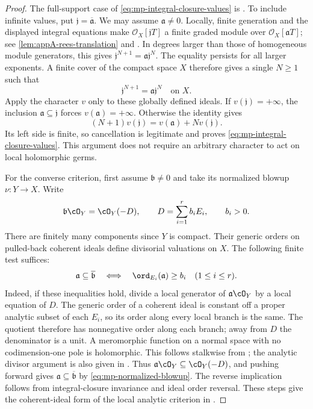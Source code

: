 \begin{proof}
The full-support case of \eqref{eq:mp-integral-closure-values} is
\cite[Lemma~2.2.4]{MPTropicalV2}. To include infinite values, put
$\mathfrak j=\overline{\mathfrak a}$. We may assume
$\mathfrak a\ne0$. Locally, finite generation and the displayed
integral equations make $\mathcal O_X[\mathfrak jT]$ a finite
graded module over $\mathcal O_X[\mathfrak aT]$; see
\cref{lem:appA-rees-translation} and \cite[Tag~00H3]{stacks-project}.
In degrees larger than those of homogeneous module generators,
this gives $\mathfrak j^{N+1}=\mathfrak a\mathfrak j^N$.
The equality persists for all larger exponents. A finite cover of
the compact space $X$ therefore gives a single $N\geq1$ such that
\[
           \mathfrak j^{N+1}=\mathfrak a\mathfrak j^N
           \quad\text{on }X.
\]
Apply the character $v$ only to these globally defined ideals.
If $v(\mathfrak j)=+\infty$, the inclusion
$\mathfrak a\subseteq\mathfrak j$ forces
$v(\mathfrak a)=+\infty$. Otherwise the identity gives
\[
 (N+1)v(\mathfrak j)=v(\mathfrak a)+Nv(\mathfrak j).
\]
Its left side is finite, so cancellation is legitimate and proves
\eqref{eq:mp-integral-closure-values}. This argument does not
require an arbitrary character to act on local holomorphic germs.

For the converse criterion, first assume $\mathfrak b\ne0$ and
take its normalized blowup $\nu:Y\to X$. Write
\[
             \mathfrak b\cO_Y=\cO_Y(-D),
             \qquad D=\sum_{i=1}^r b_iE_i,
             \qquad b_i>0.
\]
There are finitely many components since $Y$ is compact. Their
generic orders on pulled-back coherent ideals define divisorial
valuations on $X$. The following finite test suffices:
\[
 \mathfrak a\subseteq\overline{\mathfrak b}
 \quad\Longleftrightarrow\quad
 \ord_{E_i}(\mathfrak a)\geq b_i
 \quad(1\leq i\leq r).
\]
Indeed, if these inequalities hold, divide a local generator of
$\mathfrak a\cO_Y$ by a local equation of $D$.
The generic order of a coherent ideal is constant off a proper
analytic subset of each $E_i$, so its order along every local
branch is the same. The quotient therefore has nonnegative order
along each branch; away from $D$ the denominator is a unit. A meromorphic function on
a normal space with no codimension-one pole is holomorphic.
This follows stalkwise from \cite[Tag~031T]{stacks-project};
the analytic divisor argument is also given in
\cite[Proposition~4.8]{LejeuneTeissier08}.
Thus $\mathfrak a\cO_Y\subseteq\cO_Y(-D)$, and pushing forward
gives $\mathfrak a\subseteq\overline{\mathfrak b}$ by
\eqref{eq:mp-normalized-blowup}. The reverse implication follows
from integral-closure invariance and ideal order reversal. These
steps give the coherent-ideal form of the local analytic criterion
in \cite[Theorems~2.1 and~4.6]{LejeuneTeissier08}.


\end{proof}
